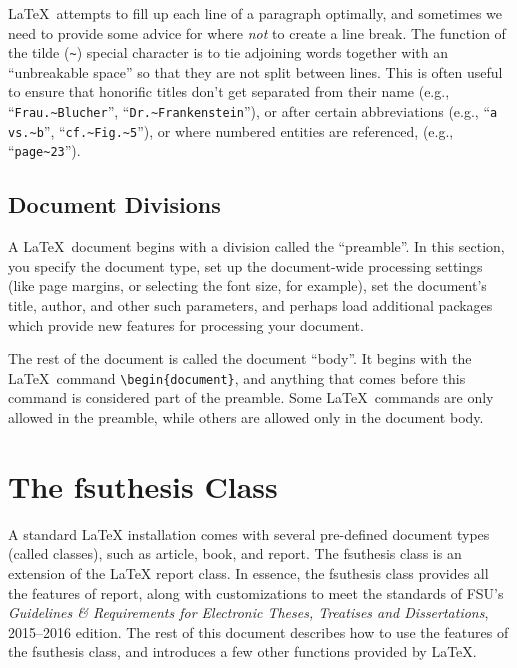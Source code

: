 \documentclass[11pt,letterpaper]{ltxdockit}[2011/03/25]
\newcommand*{\booktitle}[1]{\textit{#1}}
\newcommand*{\pkg}[1]{\textsf{#1}}
\newcommand*{\fsuth}{\pkg{fsuthesis}}
\renewcommand{\-}{\discretionary{}{}{}}
\begin{document}
\LaTeX\ attempts to fill up each line of a paragraph optimally, and
sometimes we need to provide some advice for where \emph{not} to
create a line break.  The function of the tilde (\verb|~|) special
character is to tie adjoining words together with an ``unbreakable
space'' so that they
are not split between lines.  This is often useful to ensure that
honorific titles don't get separated from their name (e.g.,
``\verb|Frau.~Blucher|'', ``\verb|Dr.~Frankenstein|''), or after
certain abbreviations (e.g., ``\verb|a vs.~b|'',
``\verb|cf.~Fig.~5|''), or where numbered entities are referenced,
(e.g., ``\verb|page~23|'').

\subsection{Document Divisions} 
A \LaTeX\ document begins with a division called the
``preamble''.  In this section, you specify the
document type, set up the document-wide processing settings (like page
margins, or selecting the font size, for example), set the document's
title, author, and other such parameters, and perhaps load additional
packages which provide new features for processing your document.

The rest of the document is called the document ``body''.  It begins
with the \LaTeX\ command
\verb|\begin{document}|,
and anything that comes before this command is considered part of the
preamble. Some \LaTeX\ commands are only allowed in the preamble,
while others are allowed only in the document body.

\section{The \fsuth{} Class}
\label{sec:class}

A standard \LaTeX{} installation comes with several pre-defined
document types (called classes), such as \pkg{article},
\pkg{book}, and \pkg{report}.  The \fsuth{} class is an
extension of the \LaTeX{} \pkg{report} class.  In essence, the
\fsuth{} class provides all the features of \pkg{report}, along
with customizations to meet the standards of FSU's
\booktitle{Guidelines \& Requirements for Electronic Theses, Treatises
  and Dissertations}, 2015--2016 edition.  The rest of this
document describes how to use the features of the \fsuth{} class, and
introduces a few other functions provided by \LaTeX.
\end{document}
